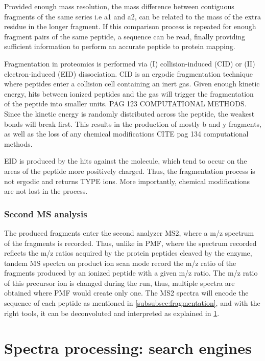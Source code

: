 \documentclass[11pt, a4paper]{report}
\begin{document}
Provided enough mass resolution, the mass difference between contiguous fragments of the same series i.e a1 and a2, can be related to the mass of the extra residue in the longer fragment. If this comparison process is repeated for enough fragment pairs of the same peptide, a sequence can be read, finally providing sufficient information to perform an accurate peptide to protein mapping.

Fragmentation in proteomics is performed via (I) collision-induced (CID) or (II) electron-induced (EID) dissociation. CID is an ergodic fragmentation technique where peptides enter a collision cell containing an inert gas. Given enough kinetic energy, hits between ionized peptides and the gas will trigger the fragmentation of the peptide into smaller units. \cite{Barsnes2008} PAG 123 COMPUTATIONAL METHODS. Since the kinetic energy is randomly distributed across the peptide, the weakest bonds will break first. This results in the production of mostly b and y fragments, as well as the loss of any chemical modifications \cite{Barsnes2008} CITE pag 134 computational methods.

EID is produced by the hits against the molecule, which tend to occur on the areas of the peptide more positively charged. Thus, the fragmentation process is not ergodic and returns TYPE ions. More importantly, chemical modifications are not lost in the process.

\subsubsection{Second MS analysis}

The produced fragments enter the second analyzer \ac{MS2}, where a m/z spectrum of the fragments is recorded. Thus, unlike in PMF, where the spectrum recorded reflects the m/z ratios acquired by the protein peptides cleaved by the enzyme, tandem MS spectra on product ion scan mode record the m/z ratio of the fragments produced by an ionized peptide with a given m/z ratio. The m/z ratio of this precursor ion is changed during the run, thus, multiple spectra are obtained where PMF would create only one. The \ac{MS2} spectra will encode the sequence of each peptide as mentioned in \ref{subsubsec:fragmentation}, and with the right tools, it can be deconvoluted and interpreted as explained in \ref{sec:search_engines}.


\section{Spectra processing: search engines}
\label{sec:search_engines}
\end{document}
